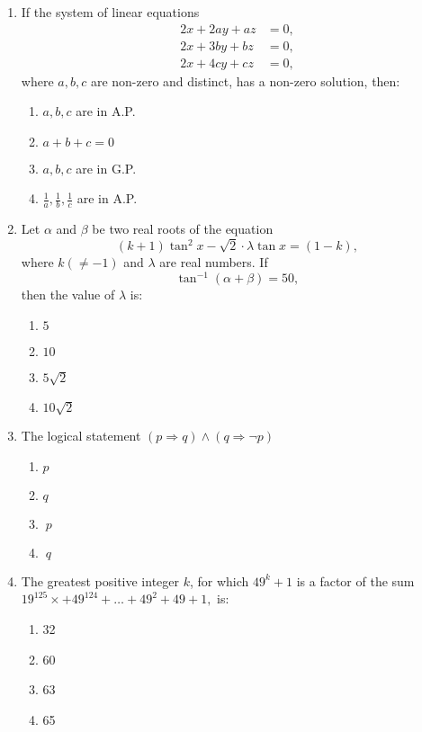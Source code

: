 \documentclass{article}
\begin{document}
\begin{enumerate}
\item If the system of linear equations
\begin{align*}
    2x + 2ay + az &= 0, \\
    2x + 3by + bz &= 0, \\
    2x + 4cy + cz &= 0,
\end{align*}
where $a, b, c$ are non-zero and distinct, has a non-zero solution, then:

\begin{enumerate}
    \item $a, b, c$ are in A.P.
    \item $a + b + c = 0$
    \item $a, b, c$ are in G.P.
    \item $\frac{1}{a}, \frac{1}{b}, \frac{1}{c}$ are in A.P.
\end{enumerate}


\item Let $\alpha$ and $\beta$ be two real roots of the equation  \[(k+1) \tan^2 x - \sqrt{2} \cdot \lambda \tan x = (1 - k),\]where $k (\neq -1)$ and $\lambda$ are real numbers. If\[\tan^{-1} (\alpha + \beta) = 50,\]
then the value of $\lambda$ is:

\begin{enumerate}
    \item $5$
    \item $10$
    \item $5\sqrt{2}$
    \item $10\sqrt{2}$
\end{enumerate}

\item The logical statement $(p \Rightarrow q) \land
	(q \Rightarrow \neg p)$

\begin{enumerate}
	\item $p$
	\item $q$
        \item $~p$
        \item $~q$
\end{enumerate}

\item The greatest positive integer $k$, for which $49^k + 1$ is a factor of the sum 
$19^{125}× + 49^{124} + \dots + 49^2 + 49 + 1,$
is:

\begin{enumerate}
    \item 32
    \item 60
    \item 63
    \item 65
\end{enumerate}


\end{enumerate}
\end{document}
